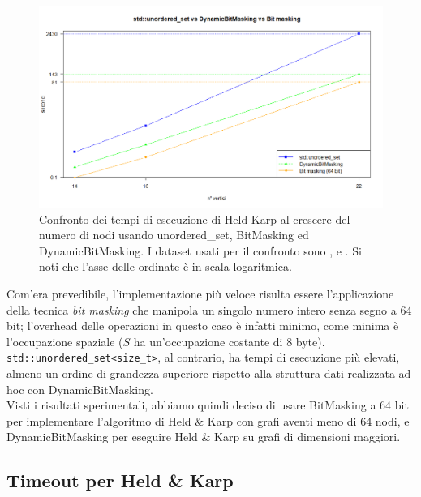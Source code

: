 \begin{figure}[h]
	\centering
	\includegraphics[width=1\textwidth]{./images/unorderedSet vs BitMasking.png}
	\caption{Confronto dei tempi di esecuzione di Held-Karp al crescere del numero di nodi usando unordered\_set, BitMasking ed DynamicBitMasking. I dataset usati per il confronto sono ,  e . Si noti che l'asse delle ordinate è in scala logaritmica.}
	\label{fig:UnorderedvsDynamicBitMasking}
\end{figure}

\noindent Com'era prevedibile, l'implementazione più veloce risulta essere l'applicazione della tecnica \textit{bit masking} che manipola un singolo numero intero senza segno a 64 bit; l'overhead delle operazioni in questo caso è infatti minimo, come minima è l'occupazione spaziale ($S$ ha un'occupazione costante di 8 byte). \\

\noindent \texttt{std::unordered_set<size_t>}, al contrario, ha tempi di esecuzione più elevati, almeno un ordine di grandezza superiore rispetto alla struttura dati realizzata ad-hoc con DynamicBitMasking. \\

\noindent Visti i risultati sperimentali, abbiamo quindi deciso di usare BitMasking a 64 bit per implementare l'algoritmo di Held \& Karp con grafi aventi meno di 64 nodi, e DynamicBitMasking per eseguire Held \& Karp su grafi di dimensioni maggiori.

\subsection{Timeout per Held \& Karp}
\label{sub:timeout}

